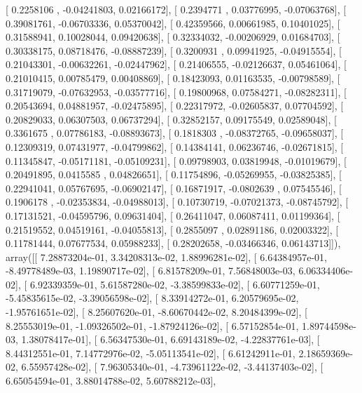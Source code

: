 \documentclass{article}
\begin{document}
       [ 0.2258106 , -0.04241803,  0.02166172],
       [ 0.2394771 ,  0.03776995, -0.07063768],
       [ 0.39081761, -0.06703336,  0.05370042],
       [ 0.42359566,  0.00661985,  0.10401025],
       [ 0.31588941,  0.10028044,  0.09420638],
       [ 0.32334032, -0.00206929,  0.01684703],
       [ 0.30338175,  0.08718476, -0.08887239],
       [ 0.3200931 ,  0.09941925, -0.04915554],
       [ 0.21043301, -0.00632261, -0.02447962],
       [ 0.21406555, -0.02126637,  0.05461064],
       [ 0.21010415,  0.00785479,  0.00408869],
       [ 0.18423093,  0.01163535, -0.00798589],
       [ 0.31719079, -0.07632953, -0.03577716],
       [ 0.19800968,  0.07584271, -0.08282311],
       [ 0.20543694,  0.04881957, -0.02475895],
       [ 0.22317972, -0.02605837,  0.07704592],
       [ 0.20829033,  0.06307503,  0.06737294],
       [ 0.32852157,  0.09175549,  0.02589048],
       [ 0.3361675 ,  0.07786183, -0.08893673],
       [ 0.1818303 , -0.08372765, -0.09658037],
       [ 0.12309319,  0.07431977, -0.04799862],
       [ 0.14384141,  0.06236746, -0.02671815],
       [ 0.11345847, -0.05171181, -0.05109231],
       [ 0.09798903,  0.03819948, -0.01019679],
       [ 0.20491895,  0.0415585 ,  0.04826651],
       [ 0.11754896, -0.05269955, -0.03825385],
       [ 0.22941041,  0.05767695, -0.06902147],
       [ 0.16871917, -0.0802639 ,  0.07545546],
       [ 0.1906178 , -0.02353834, -0.04988013],
       [ 0.10730719, -0.07021373, -0.08745792],
       [ 0.17131521, -0.04595796,  0.09631404],
       [ 0.26411047,  0.06087411,  0.01199364],
       [ 0.21519552,  0.04519161, -0.04055813],
       [ 0.2855097 ,  0.02891186,  0.02003322],
       [ 0.11781444,  0.07677534,  0.05988233],
       [ 0.28202658, -0.03466346,  0.06143713]]), array([[  7.28873204e-01,   3.34208313e-02,   1.88996281e-02],
       [  6.64384957e-01,  -8.49778489e-03,   1.19890717e-02],
       [  6.81578209e-01,   7.56848003e-03,   6.06334406e-02],
       [  6.92339359e-01,   5.61587280e-02,  -3.38599833e-02],
       [  6.60771259e-01,  -5.45835615e-02,  -3.39056598e-02],
       [  8.33914272e-01,   6.20579695e-02,  -1.95761651e-02],
       [  8.25607620e-01,  -8.60670442e-02,   8.20484399e-02],
       [  8.25553019e-01,  -1.09326502e-01,  -1.87924126e-02],
       [  6.57152854e-01,   1.89744598e-03,   1.38078417e-01],
       [  6.56347530e-01,   6.69143189e-02,  -4.22837761e-03],
       [  8.44312551e-01,   7.14772976e-02,  -5.05113541e-02],
       [  6.61242911e-01,   2.18659369e-02,   6.55957428e-02],
       [  7.96305340e-01,  -4.73961122e-02,  -3.44137403e-02],
       [  6.65054594e-01,   3.88014788e-02,   5.60788212e-03],
\end{document}
